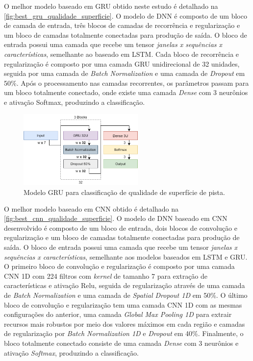 O melhor modelo baseado em GRU obtido neste estudo é detalhado na \autoref{fig:best_gru_qualidade_superficie}. O modelo de DNN é composto de um bloco de camada de entrada, três blocos de camadas de recorrência e regularização e um bloco de camadas totalmente conectadas para produção de saída. O bloco de entrada possui uma camada que recebe um tensor \emph{janelas x sequências x características}, semelhante ao baseado em LSTM. Cada bloco de recorrência e regularização é composto por uma camada GRU unidirecional de 32 unidades, seguida por uma camada de \textit{Batch Normalization} e uma camada de \textit{Dropout} em 50\%. Após o processamento nas camadas recorrentes, os parâmetros passam para um bloco totalmente conectado, onde existe uma camada \textit{Dense} com 3 neurônios e ativação Softmax, produzindo a classificação.

\begin{figure}[h!]
  \centering
  \caption{Modelo GRU para classificação de qualidade de superfície de pista.}
  \label{fig:best_gru_qualidade_superficie}
  \includegraphics[width=0.55\textwidth]{figuras/fig_47.png}
\end{figure}

O melhor modelo baseado em CNN obtido é detalhado na \autoref{fig:best_cnn_qualidade_superficie}. O modelo de DNN baseado em CNN desenvolvido é composto de um bloco de entrada, dois blocos de convolução e regularização e um bloco de camadas totalmente conectadas para produção de saída. O bloco de entrada possui uma camada que recebe um tensor \emph{janelas x sequências x características}, semelhante aos modelos baseados em LSTM e GRU. O primeiro bloco de convolução e regularização é composto por uma camada CNN 1D com 224 filtros com \textit{kernel} de tamanho 7 para extração de características e ativação Relu, seguida de regularização através de uma camada de \textit{Batch Normalization} e uma camada de \textit{Spatial Dropout 1D} em 50\%. O último bloco de convolução e regularização tem uma camada CNN 1D com as mesmas configurações do anterior, uma camada \textit{Global Max Pooling 1D} para extrair recursos mais robustos por meio dos valores máximos em cada região e camadas de regularização por \textit{Batch Normalization 1D} e \textit{Dropout} em 40\%. Finalmente, o bloco totalmente conectado consiste de uma camada \textit{Dense} com 3 neurônios e ativação \textit{Softmax}, produzindo a classificação.

